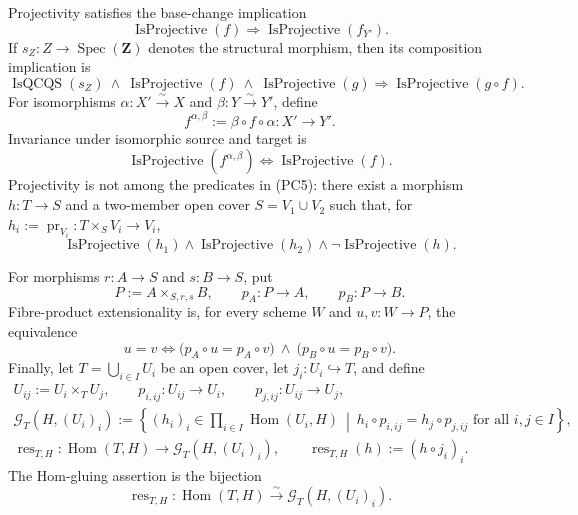 \begin{lemma}
  Projectivity satisfies the base-change implication
  \[
    \operatorname{IsProjective}(f)
      \Longrightarrow
    \operatorname{IsProjective}(f_{Y'}).                           \tag{PC6}
  \]
  If $s_Z\colon Z\to\operatorname{Spec}(\mathbf Z)$ denotes the structural
  morphism, then its composition implication is
  \[
    \operatorname{IsQCQS}(s_Z)\ \wedge\
    \operatorname{IsProjective}(f)\ \wedge\
    \operatorname{IsProjective}(g)
      \Longrightarrow
    \operatorname{IsProjective}(g\circ f).                        \tag{PC7}
  \]
  For isomorphisms
  $\alpha\colon X'\xrightarrow{\sim}X$ and
  $\beta\colon Y\xrightarrow{\sim}Y'$, define
  \[
    f^{\alpha,\beta}:=\beta\circ f\circ\alpha\colon X'\to Y'.
  \]
  Invariance under isomorphic source and target is
  \[
    \operatorname{IsProjective}(f^{\alpha,\beta})
      \Longleftrightarrow
    \operatorname{IsProjective}(f).                               \tag{PC8}
  \]
  Projectivity is not among the predicates in (PC5): there exist a morphism
  $h\colon T\to S$ and a two-member open cover
  $S=V_1\cup V_2$ such that, for
  $h_i:=\operatorname{pr}_{V_i}\colon T\times_SV_i\to V_i$,
  \[
    \operatorname{IsProjective}(h_1)\wedge
    \operatorname{IsProjective}(h_2)\wedge
    \neg\operatorname{IsProjective}(h).                           \tag{PC9}
  \]

  For morphisms $r\colon A\to S$ and $s\colon B\to S$, put
  \[
    P:=A\times_{S,r,s}B,
    \qquad p_A\colon P\to A,
    \qquad p_B\colon P\to B.
  \]
  Fibre-product extensionality is, for every scheme $W$ and
  $u,v\colon W\to P$, the equivalence
  \[
    u=v
      \Longleftrightarrow
    \bigl(p_A\circ u=p_A\circ v\bigr)\ \wedge\
    \bigl(p_B\circ u=p_B\circ v\bigr).                            \tag{PC10}
  \]
  Finally, let $T=\bigcup_{i\in I}U_i$ be an open cover, let
  $j_i\colon U_i\hookrightarrow T$, and define
  \[
  \begin{gathered}
    U_{ij}:=U_i\times_TU_j,
    \qquad p_{i,ij}\colon U_{ij}\to U_i,
    \qquad p_{j,ij}\colon U_{ij}\to U_j,\\
    \mathscr G_T(H,(U_i)_i):=
      \left\{(h_i)_i\in\prod_{i\in I}\operatorname{Hom}(U_i,H)
      \ \middle|\
      h_i\circ p_{i,ij}=h_j\circ p_{j,ij}
      \text{ for all }i,j\in I\right\},\\
    \operatorname{res}_{T,H}\colon\operatorname{Hom}(T,H)\to
      \mathscr G_T(H,(U_i)_i),
    \qquad
    \operatorname{res}_{T,H}(h):=(h\circ j_i)_i.
  \end{gathered}                                                   \tag{PC11}
  \]
  The Hom-gluing assertion is the bijection
  \[
    \operatorname{res}_{T,H}\colon
      \operatorname{Hom}(T,H)
      \xrightarrow{\ \sim\ }
      \mathscr G_T(H,(U_i)_i).                                    \tag{PC12}
  \]


\end{lemma}
